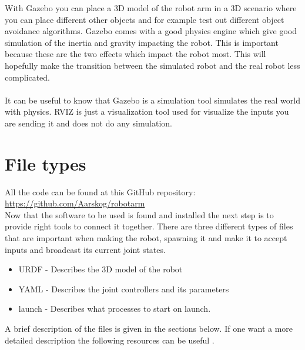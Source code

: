 With Gazebo you can place a 3D model of the robot arm in a 3D scenario where you can place different other objects and for example test out different object avoidance algorithms. Gazebo comes with a good physics engine which give good simulation of the inertia and gravity impacting the robot\cite{Gazebo}. This is important because these are the two effects which impact the robot most. This will hopefully make the transition between the simulated robot and the real robot less complicated. \\\\
It can be useful to know that Gazebo is a simulation tool simulates the real world with physics. RVIZ is just a visualization tool used for visualize the inputs you are sending it and does not do any simulation. 









\section{File types}
All the code can be found at this GitHub repository: \href{https://github.com/Aarskog/robotarm}{\underline{https://github.com/Aarskog/robotarm}}\\

Now that the software to be used is found and installed the next step is to provide right tools to connect it together. There are three different types of files that are important when making the robot, spawning it and make it to accept inputs and broadcast its current joint states. 
\begin{itemize}
    \item URDF - Describes the 3D model of the robot
    \item YAML - Describes the joint controllers and its parameters
    \item launch - Describes what processes to start on launch.
\end{itemize}
A brief description of the files is given in the sections below.  If one want a more detailed description the following resources can be useful \cite{ROSWiki,GazeboURDF,XMLdoc,YAMLdoc}.

